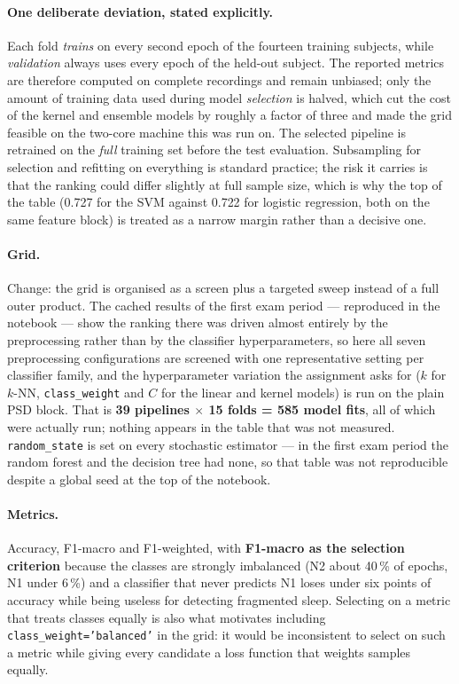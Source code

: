 \documentclass[11pt,a4paper]{article}
\newcommand{\percent}{\%}
\newcommand{\num}[1]{#1}
\newcommand{\SI}[2]{#1\,#2}
\newcommand{\change}[1]{\textcolor{black!70}{\textsf{\footnotesize #1}}}
\begin{document}
\paragraph{One deliberate deviation, stated explicitly.} Each fold \emph{trains} on every second
epoch of the fourteen training subjects, while \emph{validation} always uses every epoch of the
held-out subject. The reported metrics are therefore computed on complete recordings and remain
unbiased; only the amount of training data used during model \emph{selection} is halved, which
cut the cost of the kernel and ensemble models by roughly a factor of three and made the grid
feasible on the two-core machine this was run on. The selected pipeline is retrained on the
\emph{full} training set before the test evaluation. Subsampling for selection and refitting on
everything is standard practice; the risk it carries is that the ranking could differ slightly
at full sample size, which is why the top of the table (\num{0.727} for the SVM against
\num{0.722} for logistic regression, both on the same feature block) is treated as a narrow
margin rather than a decisive one.

\paragraph{Grid.} \change{Change: the grid is organised as a screen plus a targeted sweep
instead of a full outer product. The cached results of the first exam period --- reproduced in
the notebook --- show the ranking there was driven almost entirely by the preprocessing rather
than by the classifier hyperparameters, so here all seven preprocessing configurations are
screened with one representative setting per classifier family, and the hyperparameter
variation the assignment asks for ($k$ for $k$-NN, \texttt{class\_weight} and $C$ for the linear
and kernel models) is run on the plain PSD block.} That is \textbf{39 pipelines
$\times$ 15 folds = 585 model fits}, all of which were actually run; nothing appears in the
table that was not measured. \texttt{random\_state} is set on every stochastic estimator ---
\change{in the first exam period the random forest and the decision tree had none, so that
table was not reproducible despite a global seed at the top of the notebook.}

\paragraph{Metrics.} Accuracy, F1-macro and F1-weighted, with \textbf{F1-macro as the selection
criterion} because the classes are strongly imbalanced (N2 about \SI{40}{\percent} of epochs,
N1 under \SI{6}{\percent}) and a classifier that never predicts N1 loses under six points of
accuracy while being useless for detecting fragmented sleep. Selecting on a metric that treats
classes equally is also what motivates including \texttt{class\_weight='balanced'} in the grid:
it would be inconsistent to select on such a metric while giving every candidate a loss
function that weights samples equally.
\end{document}
